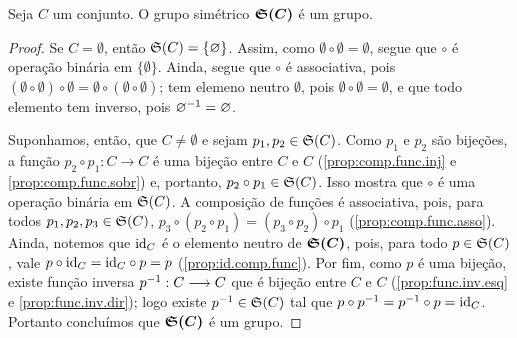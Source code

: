\begin{prop}
	Seja $C$ um conjunto. O grupo simétrico $\bm{\mathfrak{S}(C)}$ é um grupo.
\end{prop}
\begin{proof}
	Se $C=\emptyset$, então $\mathfrak{S}(C)=\{\varnothing\}$. Assim, como $\emptyset \circ \emptyset = \emptyset$, segue que $\circ$ é operação binária em $\{\emptyset\}$. Ainda, segue que $\circ$ é associativa, pois $(\emptyset \circ \emptyset) \circ \emptyset = \emptyset \circ (\emptyset \circ \emptyset)$; tem elemeno neutro $\emptyset$, pois $\emptyset \circ \emptyset = \emptyset$, e que todo elemento tem inverso, pois $\varnothing^{-1} = \varnothing$.

	Suponhamos, então, que $C \neq \emptyset$ e sejam $p_1,p_2 \in \mathfrak{S}(C)$. Como $p_1$ e $p_2$ são bijeções, a função $p_2 \circ p_1: C \to C$ é uma bijeção entre $C$ e $C$ (\ref{prop:comp.func.inj} e \ref{prop:comp.func.sobr}) e, portanto, $p_2 \circ p_1 \in \mathfrak{S}(C)$. Isso mostra que $\circ$ é uma operação binária em $\mathfrak{S}(C)$. A composição de funções é associativa, pois, para todos $p_1,p_2,p_3 \in \mathfrak{S}(C)$, $p_3 \circ (p_2 \circ p_1) = (p_3 \circ p_2) \circ p_1$ (\ref{prop:comp.func.asso}). Ainda, notemos que $\mathrm{id}_C$ é o elemento neutro de $\bm{\mathfrak{S}(C)}$, pois, para todo $p \in \mathfrak{S}(C)$, vale $p \circ \mathrm{id}_C = \mathrm{id}_C \circ p = p$ (\ref{prop:id.comp.func}). Por fim, como $p$ é uma bijeção, existe função inversa $p^{-1}: C \longrightarrow C$ que é bijeção entre $C$ e $C$ (\ref{prop:func.inv.esq} e \ref{prop:func.inv.dir}); logo existe $p^{-1} \in \mathfrak{S}(C)$ tal que $p \circ p^{-1} = p^{-1} \circ p = \mathrm{id}_C$. Portanto concluímos que $\bm{\mathfrak{S}(C)}$ é um grupo.
\end{proof}

